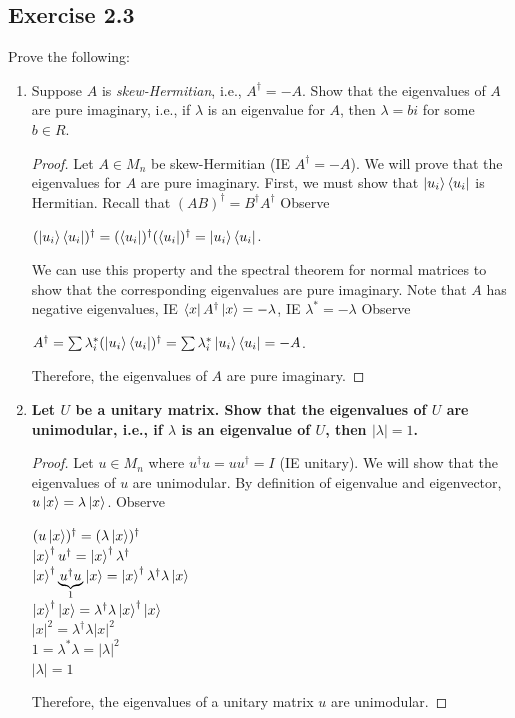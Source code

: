 \documentclass[12pt]{article}
\theoremstyle{plain}
\theoremstyle{nonumberplain}
\theoremstyle{plain}
\theoremstyle{nonumberplain}
\newtheorem{proof}{Proof.}
\newcommand\1{{\bf 1}}
\newcommand{\<}{\left\langle}
\renewcommand{\>}{\right\rangle}
\begin{document}
\subsection{Exercise 2.3}
Prove the following:
\begin{enumerate}[label=(\alph*)]
\item Suppose $A$ is \textit{skew-Hermitian}, i.e., $A^\dagger=-A$. Show that the eigenvalues of $A$ are pure imaginary, i.e., if $\lambda$ is an eigenvalue for $A$, then $\lambda = bi$ for some $b \in R$.\\
\begin{proof}
Let $A\in M_n$ be skew-Hermitian (IE $A^\dagger=-A$). We will prove that the eigenvalues for $A$ are pure imaginary. First, we must show that $\ket{u_i}\bra{u_i}$ is Hermitian. Recall that $(AB)^\dagger=B^\dagger A^\dagger$ Observe
\begin{center}
$(\ket{u_i}\bra{u_i})^\dagger=(\bra{u_i})^\dagger(\bra{u_i})^\dagger=\ket{u_i}\bra{u_i}$.
\end{center}
We can use this property and the spectral theorem for normal matrices to show that the corresponding eigenvalues are pure imaginary. Note that $A$ has negative eigenvalues, IE $\bra{x}A^\dagger\ket{x}=-\lambda$, IE $\lambda^*=-\lambda$ Observe
\begin{center}
$A^\dagger=\sum\lambda_i^*(\ket{u_i}\bra{u_i})^\dagger=\sum\lambda_i^*\ket{u_i}\bra{u_i}=-A$.\\
\end{center}
Therefore, the eigenvalues of $A$ are pure imaginary.
\end{proof}

\item \textbf{Let $U$ be a unitary matrix. Show that the eigenvalues of $U$ are unimodular, i.e., if $\lambda$ is an eigenvalue of $U$, then $|\lambda| = 1$.}
\begin{proof}
Let $u\in M_n$ where $u^\dagger u=uu^\dagger=I$ (IE unitary). We will show that the eigenvalues of $u$ are unimodular. By definition of eigenvalue and eigenvector, $u\ket{x}=\lambda\ket{x}$. Observe
\begin{center}
$(u\ket{x})^\dagger=(\lambda\ket{x})^\dagger$\\$\ket{x}^\dagger u^\dagger=\ket{x}^\dagger \lambda^\dagger$ \\
$\ket{x}^\dagger \underbrace{\textstyle u^\dagger u }_{\mathclap{1}}\ket{x}=\ket{x}^\dagger\lambda^\dagger\lambda\ket{x}$ \\
$\ket{x}^\dagger\ket{x}=\lambda^\dagger\lambda\ket{x}^\dagger\ket{x}$ \\
$|x|^2=\lambda^\dagger\lambda |x|^2$ \\
$1=\lambda^*\lambda=|\lambda|^2$ \\
$|\lambda|=1$
\end{center}
Therefore, the eigenvalues of a unitary matrix $u$ are unimodular.
\end{proof}


\end{enumerate}
\end{document}
